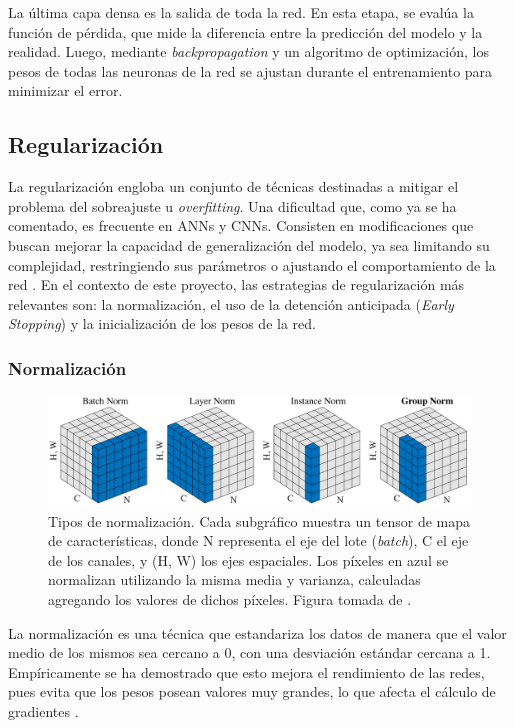 La última capa densa es la salida de toda la red. En esta etapa, se evalúa la función de pérdida, que mide la diferencia entre la predicción del modelo y la realidad. Luego, mediante \textit{backpropagation} y un algoritmo de optimización, los pesos de todas las neuronas de la red se ajustan durante el entrenamiento para minimizar el error.

\subsection{Regularización}
\label{subsection:regularization}
La regularización engloba un conjunto de técnicas destinadas a mitigar el problema del sobreajuste u \textit{overfitting}. Una dificultad que, como ya se ha comentado, es frecuente en ANNs y CNNs. Consisten en modificaciones que buscan mejorar la capacidad de generalización del modelo, ya sea limitando su complejidad, restringiendo sus parámetros o ajustando el comportamiento de la red \cite{Goodfellow-et-al-2016}. En el contexto de este proyecto, las estrategias de regularización más relevantes son: la normalización, el uso de la detención anticipada (\textit{Early Stopping}) y la inicialización de los pesos de la red.

\subsubsection{Normalización}

\begin{figure}[h]
    \centering
    \includegraphics[width=\linewidth]{figures/2_theory/normTypes.pdf}
    \caption[Tipos de normalización]{Tipos de normalización. Cada subgráfico muestra un tensor de mapa de características, donde N representa el eje del lote (\textit{batch}), C el eje de los canales, y (H, W) los ejes espaciales. Los píxeles en azul se normalizan utilizando la misma media y varianza, calculadas agregando los valores de dichos píxeles. Figura tomada de \cite{wu2018group}.}
    \label{fig:normTypes}
\end{figure}


La normalización es una técnica que estandariza los datos de manera que el valor medio de los mismos sea cercano a 0, con una desviación estándar cercana a 1. Empíricamente se ha demostrado que esto mejora el rendimiento de las redes, pues evita que los pesos posean valores muy grandes, lo que afecta el cálculo de gradientes \cite{ioffe_batch_2015}. 

